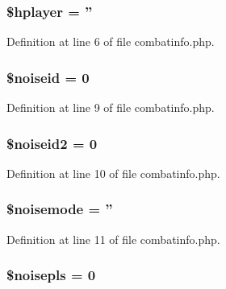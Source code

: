 \hypertarget{combatinfo_8php_a173fd371b372340fb8c3df98522232fd}{
\subsubsection[{\$hplayer}]{\setlength{\rightskip}{0pt plus 5cm}\$hplayer = ''}}\label{combatinfo_8php_a173fd371b372340fb8c3df98522232fd}


Definition at line 6 of file combatinfo.\+php.

\hypertarget{combatinfo_8php_a415ef90f68fcd726895290a3a5a6a187}{
\subsubsection[{\$noiseid}]{\setlength{\rightskip}{0pt plus 5cm}\$noiseid = 0}}\label{combatinfo_8php_a415ef90f68fcd726895290a3a5a6a187}


Definition at line 9 of file combatinfo.\+php.

\hypertarget{combatinfo_8php_a12ce23dc2c71c44f308f9070bfbc0716}{
\subsubsection[{\$noiseid2}]{\setlength{\rightskip}{0pt plus 5cm}\$noiseid2 = 0}}\label{combatinfo_8php_a12ce23dc2c71c44f308f9070bfbc0716}


Definition at line 10 of file combatinfo.\+php.

\hypertarget{combatinfo_8php_a5d55776dd59bf6d13872b95dccdaf633}{
\subsubsection[{\$noisemode}]{\setlength{\rightskip}{0pt plus 5cm}\$noisemode = ''}}\label{combatinfo_8php_a5d55776dd59bf6d13872b95dccdaf633}


Definition at line 11 of file combatinfo.\+php.

\hypertarget{combatinfo_8php_a6a9d28474fe361d5705e48ef9167de5e}{
\subsubsection[{\$noisepls}]{\setlength{\rightskip}{0pt plus 5cm}\$noisepls = 0}}\label{combatinfo_8php_a6a9d28474fe361d5705e48ef9167de5e}


